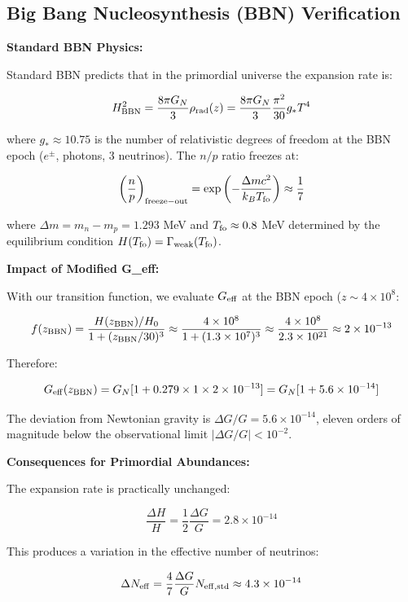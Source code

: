 \documentclass[11pt,a4paper]{article}
\begin{document}
\hypertarget{big-bang-nucleosynthesis-bbn-verification}{%
\subsection{Big Bang Nucleosynthesis (BBN)
Verification}\label{big-bang-nucleosynthesis-bbn-verification}}

\textbf{Standard BBN Physics:}

Standard BBN predicts that in the primordial universe the expansion rate
is:

\[H^2_{\rm BBN} = \frac{8\pi G_N}{3}\rho_{\rm rad}(z) = \frac{8\pi G_N}{3} \frac{\pi^2}{30} g_* T^4\]

where \(g_* \approx 10.75\) is the number of relativistic degrees of
freedom at the BBN epoch (\(e^\pm\), photons, 3 neutrinos). The \(n/p\)
ratio freezes at:

\[\left(\frac{n}{p}\right)_{\rm freeze-out} = \exp\left(-\frac{\Delta m c^2}{k_B T_{\rm fo}}\right) \approx \frac{1}{7}\]

where \(\Delta m = m_n - m_p = 1.293\) MeV and
\(T_{\rm fo} \approx 0.8\) MeV determined by the equilibrium condition
\(H(T_{\rm fo}) = \Gamma_{\rm weak}(T_{\rm fo})\).

\textbf{Impact of Modified G\_eff:}

With our transition function, we evaluate \(G_{\rm eff}\) at the BBN
epoch (\(z \sim 4 \times 10^8\):

\[f(z_{\rm BBN}) = \frac{H(z_{\rm BBN})/H_0}{1 + (z_{\rm BBN}/30)^3} \approx \frac{4 \times 10^8}{1 + (1.3 \times 10^7)^3} \approx \frac{4 \times 10^8}{2.3 \times 10^{21}} \approx 2 \times 10^{-13}\]

Therefore:

\[G_{\rm eff}(z_{\rm BBN}) = G_N[1 + 0.279 \times 1 \times 2\times10^{-13}] = G_N[1 + 5.6\times10^{-14}]\]

The deviation from Newtonian gravity is
\(\Delta G/G = 5.6 \times 10^{-14}\), eleven orders of magnitude below
the observational limit \(|\Delta G/G| < 10^{-2}\).

\textbf{Consequences for Primordial Abundances:}

The expansion rate is practically unchanged:

\[\frac{\Delta H}{H} = \frac{1}{2}\frac{\Delta G}{G} = 2.8 \times 10^{-14}\]

This produces a variation in the effective number of neutrinos:

\[\Delta N_{\rm eff} = \frac{4}{7}\frac{\Delta G}{G} N_{\rm eff,std} \approx 4.3 \times 10^{-14}\]
\end{document}
